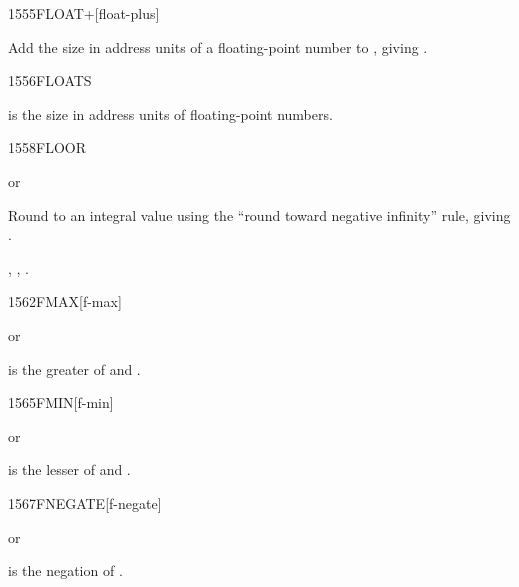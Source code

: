 \begin{worddef}{1555}{FLOAT+}[float-plus]
\item {}

	Add the size in address units of a floating-point number to
	, giving .
\end{worddef}

\vspace*{-1ex}
\begin{worddef}{1556}{FLOATS}
\item {}

	 is the size in address units of  floating-point
	numbers.
\end{worddef}

\vspace*{-1ex}
\begin{worddef}{1558}{FLOOR}
\item {} or

	Round  to an integral value using the ``round toward
	negative infinity'' rule, giving .

\see {}, ,
	.
\end{worddef}

\vspace*{-1ex}
\begin{worddef}{1562}{FMAX}[f-max]
\item {} or

	 is the greater of  and .
\end{worddef}

\vspace*{-1ex}
\begin{worddef}{1565}{FMIN}[f-min]
\item {} or

	 is the lesser of  and .
\end{worddef}

\vspace*{-1ex}
\begin{worddef}{1567}{FNEGATE}[f-negate]
\item {} or

	 is the negation of .
\end{worddef}

